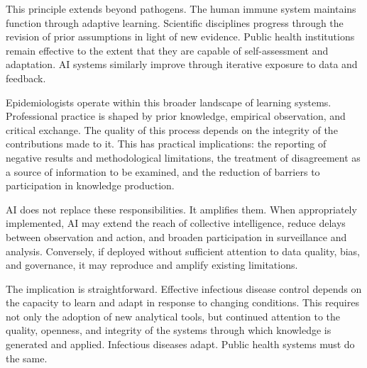 \documentclass[12pt]{article}
\begin{document}
This principle extends beyond pathogens. The human immune system maintains function through adaptive learning. Scientific disciplines progress through the revision of prior assumptions in light of new evidence. Public health institutions remain effective to the extent that they are capable of self-assessment and adaptation. AI systems similarly improve through iterative exposure to data and feedback.

Epidemiologists operate within this broader landscape of learning systems. Professional practice is shaped by prior knowledge, empirical observation, and critical exchange. The quality of this process depends on the integrity of the contributions made to it. This has practical implications: the reporting of negative results and methodological limitations, the treatment of disagreement as a source of information to be examined, and the reduction of barriers to participation in knowledge production.

AI does not replace these responsibilities. It amplifies them. When appropriately implemented, AI may extend the reach of collective intelligence, reduce delays between observation and action, and broaden participation in surveillance and analysis. Conversely, if deployed without sufficient attention to data quality, bias, and governance, it may reproduce and amplify existing limitations.

The implication is straightforward. Effective infectious disease control depends on the capacity to learn and adapt in response to changing conditions. This requires not only the adoption of new analytical tools, but continued attention to the quality, openness, and integrity of the systems through which knowledge is generated and applied. Infectious diseases adapt. Public health systems must do the same.

\vspace{1cm}
\end{document}
